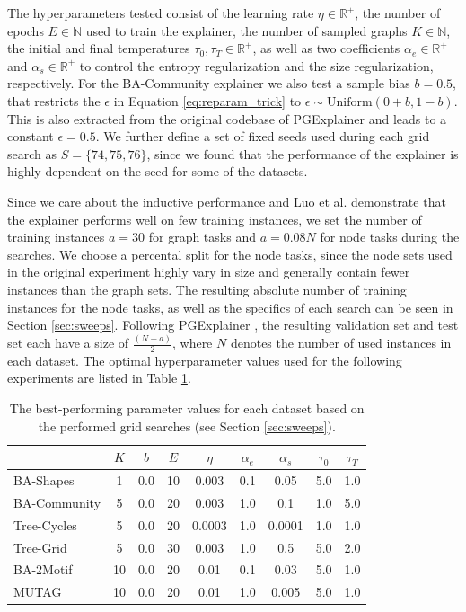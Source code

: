 The hyperparameters tested consist of the learning rate $\eta \in \mathbb{R}^+$, the number of epochs $E \in \mathbb{N}$ used to train the explainer, the number of sampled graphs $K \in \mathbb{N}$, the initial and final temperatures $\tau_0, \tau_T \in \mathbb{R}^+$, as well as two coefficients $\alpha_e\in \mathbb{R}^+$ and $\alpha_s\in \mathbb{R}^+$ to control the entropy regularization and the size regularization, respectively. For the BA-Community explainer we also test a sample bias $b=0.5$, that restricts the $\epsilon$ in Equation \ref{eq:reparam_trick} to $\epsilon \sim \text{Uniform}(0+b,1-b)$. This is also extracted from the original codebase of PGExplainer \cite{luo2020parameterized} and leads to a constant $\epsilon=0.5$. We further define a set of fixed seeds used during each grid search as $S=\{74,75,76\}$, since we found that the performance of the explainer is highly dependent on the seed for some of the datasets. \bigskip

Since we care about the inductive performance and Luo et al. \cite{luo2020parameterized} demonstrate that the explainer performs well on few training instances, we set the number of training instances $a=30$ for graph tasks and $a=0.08N$ for node tasks during the searches. We choose a percental split for the node tasks, since the node sets used in the original experiment highly vary in size and generally contain fewer instances than the graph sets. The resulting absolute number of training instances for the node tasks, as well as the specifics of each search can be seen in Section \ref{sec:sweeps}. Following PGExplainer \cite{luo2020parameterized}, the resulting validation set and test set each have a size of $\frac{(N-a)}{2}$, where $N$ denotes the number of used instances in each dataset. The optimal hyperparameter values used for the following experiments are listed in Table \ref{tab:best_sweep_values}. \bigskip

\begin{table}[h]
    \centering
    \small
    \begin{tabular}{l|c c c c c c c c}
     & $K$ & $b$ & $E$ & $\eta$ & $\alpha_e$ & $\alpha_s$ & $\tau_0$ & $\tau_T$ \\ \hline
    BA-Shapes & 1 & 0.0 & 10 & 0.003 & 0.1 & 0.05 & 5.0 & 1.0 \\
    BA-Community & 5 & 0.0 & 20 & 0.003 & 1.0 & 0.1 & 1.0 & 5.0 \\ 
    Tree-Cycles & 5 & 0.0 & 20 & 0.0003 & 1.0 & 0.0001 & 1.0 & 1.0 \\
    Tree-Grid & 5 & 0.0 & 30 & 0.003 & 1.0 & 0.5 & 5.0 & 2.0 \\ \hline
    BA-2Motif & 10 & 0.0 & 20 & 0.01 & 0.1 & 0.03 & 5.0 & 1.0 \\
    MUTAG & 10 & 0.0 & 20 & 0.01 & 1.0 & 0.005 & 5.0 & 1.0 \\
    \end{tabular}
    \caption[Optimal explainer parameter values for all replication datasets]{The best-performing parameter values for each dataset based on the performed grid searches (see Section \ref{sec:sweeps}).}
    \label{tab:best_sweep_values}
\end{table}

